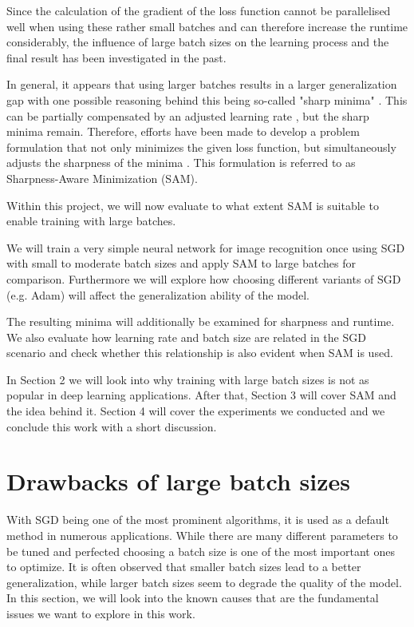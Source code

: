 \documentclass[10pt,conference,compsocconf]{IEEEtran}
\begin{document}
Since the calculation of the gradient of the loss function cannot be parallelised well when using these rather small batches and can therefore increase the runtime considerably, the influence of large batch sizes on the learning process and the final result has been investigated in the past. 

In general, it appears that using larger batches results in a larger generalization gap with one possible reasoning behind this being so-called "sharp minima" \cite{keskar2017largebatch}. This can be partially compensated by an adjusted learning rate \cite{goyal2018accurate}, but the sharp minima remain. 
Therefore, efforts have been made to develop a problem formulation that not only minimizes the given loss function, but simultaneously adjusts the sharpness of the minima \cite{foret2021sharpnessaware}. This formulation is referred to as Sharpness-Aware Minimization (SAM). 


Within this project, we will now evaluate to what extent SAM is suitable to enable training with large batches. 

We will train a very simple neural network for image recognition once using SGD with small to moderate batch sizes and apply SAM to large batches for comparison. Furthermore we will explore how choosing different variants of SGD (e.g. Adam) will affect the generalization ability of the model.

The resulting minima will additionally be examined for sharpness and runtime. 
We also evaluate how learning rate and batch size are related in the SGD scenario and check whether this relationship is also evident when SAM is used. 


In Section 2 we will look into why training with large batch sizes is not as popular in deep learning applications. After that, Section 3 will cover SAM and the idea behind it. Section 4 will cover the experiments we conducted and we conclude this work with a short discussion.

\section{Drawbacks of large batch sizes}
\label{sec:drawbacks-large-bs}

With SGD being one of the most prominent algorithms, it is used as a default method in numerous applications. While there are many different parameters to be tuned and perfected choosing a batch size is one of the most important ones to optimize. It is often observed that smaller batch sizes lead to a better generalization, while larger batch sizes seem to degrade the quality of the model. In this section, we will look into the known causes that are the fundamental issues we want to explore in this work. 
\end{document}

